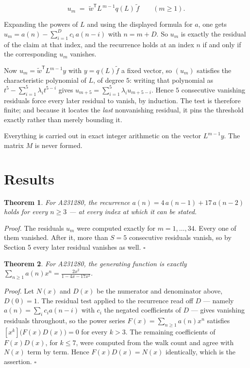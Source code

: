 \documentclass[11pt]{article}
\newtheorem{theorem}{Theorem}
\theoremstyle{definition}
\begin{document}
\[u_m \;=\; \tilde w^{\mathsf T} L^{\,m-1} q(L)\,\tilde f \qquad (m \ge 1).\]

Expanding the powers of $L$ and using the displayed formula for $a$, one gets $u_m = a(n) - \sum_{i=1}^{D} c_i\,a(n-i)$ with $n = m + D$. So $u_m$ is exactly the residual of the claim at that index, and the recurrence holds at an index $n$ if and only if the corresponding $u_m$ vanishes.

Now $u_m = \tilde w^{\mathsf T} L^{m-1} y$ with $y = q(L)\tilde f$ a fixed vector, so $(u_m)$ satisfies the characteristic polynomial of $L$, of degree $5$: writing that polynomial as $t^{5} - \sum_{i=1}^{5} \lambda_i t^{5-i}$ gives $u_{m+5} = \sum_{i=1}^{5} \lambda_i u_{m+5-i}$. Hence $5$ consecutive vanishing residuals force every later residual to vanish, by induction. The test is therefore finite; and because it locates the {\itshape last} nonvanishing residual, it pins the threshold exactly rather than merely bounding it.

Everything is carried out in exact integer arithmetic on the vector $L^{m-1}y$. The matrix $M$ is never formed.

\section{Results}

\begin{theorem} For A231280, the recurrence $a(n) = 4\,a(n-1) + 17\,a(n-2)$ holds for every $n \ge 3$ --- at every index at which it can be stated.\end{theorem}

{\itshape Proof.} The residuals $u_m$ were computed exactly for $m = 1,\dots,34$. Every one of them vanished. After it, more than $S = 5$ consecutive residuals vanish, so by Section 5 every later residual vanishes as well. $\square$

\begin{theorem} For A231280, the generating function is exactly $\sum_{n\ge 1} a(n)x^n = \frac{2x^{2}}{1 - 4x - 17x^{2}}$.\end{theorem}

{\itshape Proof.} Let $N(x)$ and $D(x)$ be the numerator and denominator above, $D(0)=1$. The residual test applied to the recurrence read off $D$ --- namely $a(n) = \sum_i c_i a(n-i)$ with $c_i$ the negated coefficients of $D$ --- gives vanishing residuals throughout, so the power series $F(x)=\sum_{n\ge 1}a(n)x^n$ satisfies $[x^k]\bigl(F(x)D(x)\bigr) = 0$ for every $k > 3$. The remaining coefficients of $F(x)D(x)$, for $k \le 7$, were computed from the walk count and agree with $N(x)$ term by term. Hence $F(x)D(x) = N(x)$ identically, which is the assertion. $\square$
\end{document}
